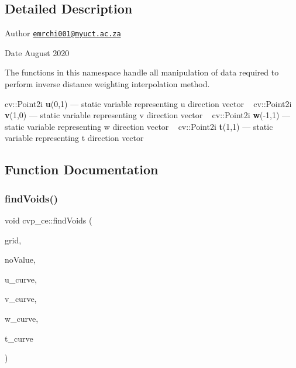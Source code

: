 \subsection{Detailed Description}
\begin{DoxyAuthor}{Author}
\href{mailto:emrchi001@myuct.ac.za}{\tt emrchi001@myuct.\+ac.\+za} 
\end{DoxyAuthor}
\begin{DoxyDate}{Date}
August 2020
\end{DoxyDate}
The functions in this namespace handle all manipulation of data required to perform inverse distance weighting interpolation method.

\label{namespacecvp__ce_DIRECTIONS}%
%
cv\+::\+Point2i {\bfseries u}(0,1) --- static variable representing \textquotesingle{}u\textquotesingle{} direction vector ~\newline
 cv\+::\+Point2i {\bfseries v}(1,0) --- static variable representing \textquotesingle{}v\textquotesingle{} direction vector ~\newline
 cv\+::\+Point2i {\bfseries w}(-\/1,1) --- static variable representing \textquotesingle{}w\textquotesingle{} direction vector ~\newline
 cv\+::\+Point2i {\bfseries t}(1,1) --- static variable representing \textquotesingle{}t\textquotesingle{} direction vector ~\newline
 

\subsection{Function Documentation}
\mbox{\label{namespacecvp__ce_a2f7e3603ca020f13c8cee162c45321c6}} 
\subsubsection{\texorpdfstring{find\+Voids()}{findVoids()}}
{\footnotesize\ttfamily void cvp\+\_\+ce\+::find\+Voids (\begin{DoxyParamCaption}\item[{const cv\+::\+Mat \&}]{grid,  }\item[{const double}]{no\+Value,  }\item[{curve\+Patch \&}]{u\+\_\+curve,  }\item[{curve\+Patch \&}]{v\+\_\+curve,  }\item[{curve\+Patch \&}]{w\+\_\+curve,  }\item[{curve\+Patch \&}]{t\+\_\+curve }\end{DoxyParamCaption})}



